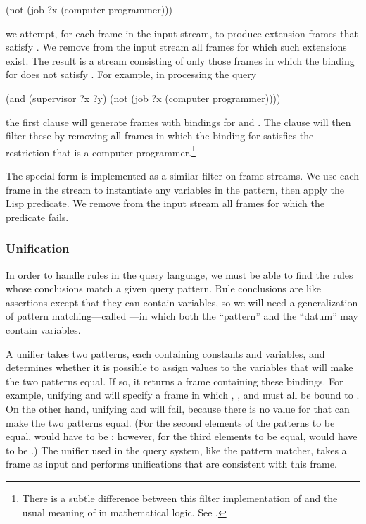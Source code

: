 \begin{codeBlock}
(not (job ?x (computer programmer)))
\end{codeBlock}

\noindent
we attempt, for each frame in the input stream, to produce extension frames
that satisfy .  We remove from the input
stream all frames for which such extensions exist.  The result is a stream
consisting of only those frames in which the binding for  does not
satisfy .  For example, in processing the
query

\begin{codeBlock}
(and (supervisor ?x ?y)
     (not (job ?x (computer programmer))))
\end{codeBlock}

\noindent
the first clause will generate frames with bindings for  and
.  The  clause will then filter these by removing all frames
in which the binding for  satisfies the restriction that  is
a computer programmer.\footnote{There is a subtle difference between this
filter implementation of  and the usual meaning of  in
mathematical logic.  See .}

The  special form is implemented as a similar filter on frame
streams.  We use each frame in the stream to instantiate any variables in the
pattern, then apply the Lisp predicate.  We remove from the input stream all
frames for which the predicate fails.

\subsubsection*{Unification}

In order to handle rules in the query language, we must be able to find the
rules whose conclusions match a given query pattern.  Rule conclusions are like
assertions except that they can contain variables, so we will need a
generalization of pattern matching---called ---in which
both the ``pattern'' and the ``datum'' may contain variables.

A unifier takes two patterns, each containing constants and variables, and
determines whether it is possible to assign values to the variables that will
make the two patterns equal.  If so, it returns a frame containing these
bindings.  For example, unifying  and  will
specify a frame in which , , and  must all be bound
to .  On the other hand, unifying  and 
will fail, because there is no value for  that can make the two
patterns equal.  (For the second elements of the patterns to be equal,
 would have to be ; however, for the third elements to be
equal,  would have to be .)  The unifier used in the query
system, like the pattern matcher, takes a frame as input and performs
unifications that are consistent with this frame.

